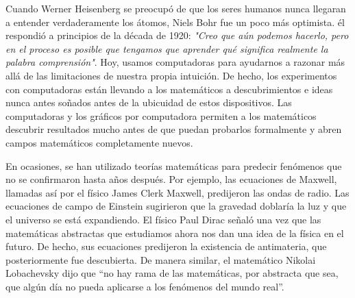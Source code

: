 \documentclass{article}
\begin{document}
Cuando Werner Heisenberg se preocup\'o de que los seres humanos nunca llegaran a
entender verdaderamente los \'atomos, Niels Bohr fue un poco m\'as optimista. \'el
respondi\'o a principios de la d\'ecada de 1920: \textit{"Creo que a\'un podemos
hacerlo, pero en el proceso es posible que tengamos que aprender qu\'e significa
realmente la palabra comprensi\'on"}. Hoy, usamos computadoras para ayudarnos a
razonar m\'as all\'a de las limitaciones de nuestra propia intuici\'on. De hecho, los
experimentos con computadoras est\'an llevando a los matem\'aticos a descubrimientos
e ideas nunca antes so\~nados antes de la ubicuidad de estos dispositivos. Las
computadoras y los gr\'aficos por computadora permiten a los matem\'aticos descubrir
resultados mucho antes de que puedan probarlos formalmente y abren campos
matem\'aticos completamente nuevos. 

En ocasiones, se han utilizado teor\'ias matem\'aticas para predecir fen\'omenos que
no se confirmaron hasta a\~nos despu\'es. Por ejemplo, las ecuaciones de Maxwell,
llamadas as\'i por el f\'isico James Clerk Maxwell, predijeron las ondas de radio.
Las ecuaciones de campo de Einstein sugirieron que la gravedad doblar\'ia la luz y
que el universo se est\'a expandiendo. El f\'isico Paul Dirac se\~nal\'o una vez que las
matem\'aticas abstractas que estudiamos ahora nos dan una idea de la f\'isica en el
futuro. De hecho, sus ecuaciones predijeron la existencia de antimateria, que
posteriormente fue descubierta. De manera similar, el matem\'atico Nikolai
Lobachevsky dijo que “no hay rama de las matem\'aticas, por abstracta que sea, que
alg\'un d\'ia no pueda aplicarse a los fen\'omenos del mundo real”.




\pagebreak
 

\end{document}
